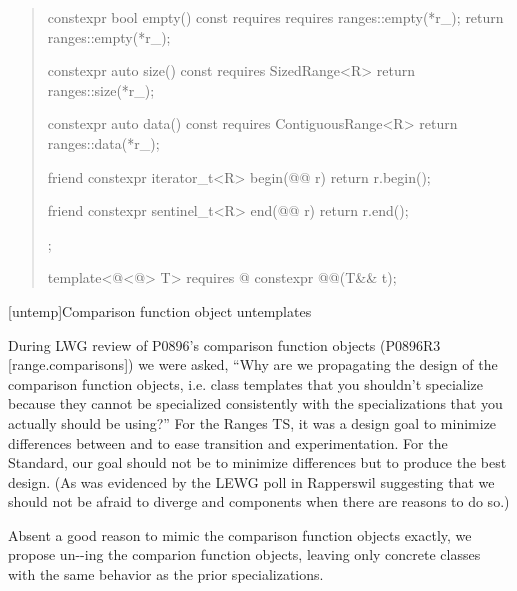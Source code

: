 \begin{itemize}
\begin{quote}
\begin{codeblock}
{{    constexpr bool empty() const
      requires requires { ranges::empty(*r_); }
    { return ranges::empty(*r_); }

    constexpr auto size() const requires SizedRange<R>
    { return ranges::size(*r_); }

    constexpr auto data() const requires ContiguousRange<R>
    { return ranges::data(*r_); }

    friend constexpr iterator_t<R> begin(@@ r)
    { return r.begin(); }

    friend constexpr sentinel_t<R> end(@@ r)
    { return r.end(); }
  };
}
\end{codeblock}

\setcounter{Paras}{0}
\begin{itemdecl}
template<@<@> T>
  requires @\seebelow@
constexpr @@(T&& t);
\end{itemdecl}

\begin{itemdescr}
[...]
\end{itemdescr}
  \end{quote}
\end{itemize}


[untemp]{Comparison function object untemplates}

During LWG review of P0896's comparison function objects
(P0896R3 [range.comparisons]) we were asked, ``Why are we propagating the design
of the  comparison function objects, i.e. class templates that you
shouldn't specialize because they cannot be specialized consistently with the
 specializations that you actually should be using?'' For the Ranges
TS, it was a design goal to minimize differences between  and
 to ease transition and experimentation. For the Standard, our
goal should not be to minimize differences but to produce the best design. (As
was evidenced by the LEWG poll in Rapperswil suggesting that we should not be
afraid to diverge  and  components when there are reasons
to do so.)

Absent a good reason to mimic the  comparison function objects
exactly, we propose un--ing the  comparion
function objects, leaving only concrete classes with the same behavior as the
prior  specializations.

